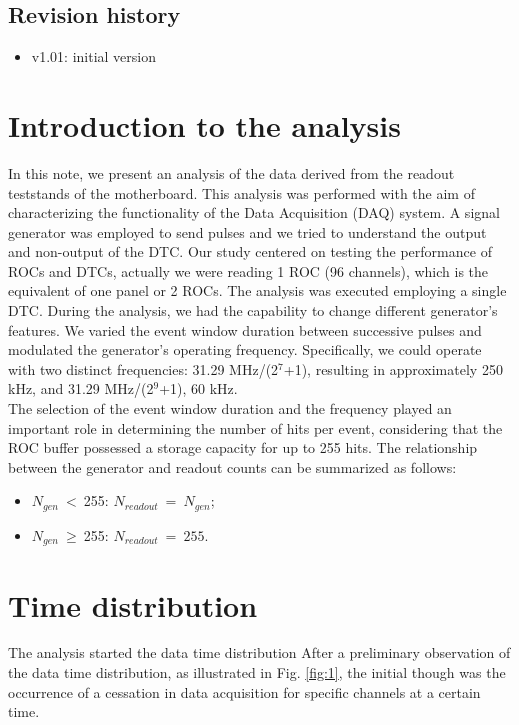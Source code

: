 \documentclass[12pt]{article}
\begin{document}
\subsection {Revision history} 
\begin{itemize}
\item
  v1.01: initial version
\end{itemize}

\section {Introduction to the analysis}

In this note, we present an analysis of the data derived from the readout teststands of the motherboard.
This analysis was performed with the aim of characterizing the functionality of the Data Acquisition (DAQ) system.
A signal generator was employed to send pulses and we tried to understand the output and non-output of the DTC. 
Our study centered on testing the performance of ROCs and DTCs, actually we were reading 1 ROC (96 channels), 
which is the equivalent of one panel or 2 ROCs. The analysis was executed employing a single DTC.
During the analysis, we had the capability to change different generator's features. We varied the event
window duration between successive pulses and modulated the generator's operating frequency. 
Specifically, we could operate with two distinct frequencies: 31.29 MHz/(2$^7$+1), resulting in approximately 250 kHz,
and 31.29 MHz/(2$^9$+1), 60 kHz. \\
The selection of the event window duration and the frequency played an important role in determining the number of hits per event,
considering that the ROC buffer possessed a storage capacity for up to 255 hits. The relationship between the generator 
and readout counts can be summarized as follows:
\begin{itemize}
    \item $N_{gen} \ < \ $255: $N_{readout} \ = \ N_{gen}$;
    \item $N_{gen} \ \geq \ $255: $N_{readout} \ = \ 255$.
\end{itemize}

\section{Time distribution}
The analysis started the data time distribution 
After a preliminary observation of the data time distribution, as illustrated in Fig. \ref{fig:1}, the initial though  was 
the occurrence of a cessation in data acquisition for specific channels at a certain time.
\end{document}
